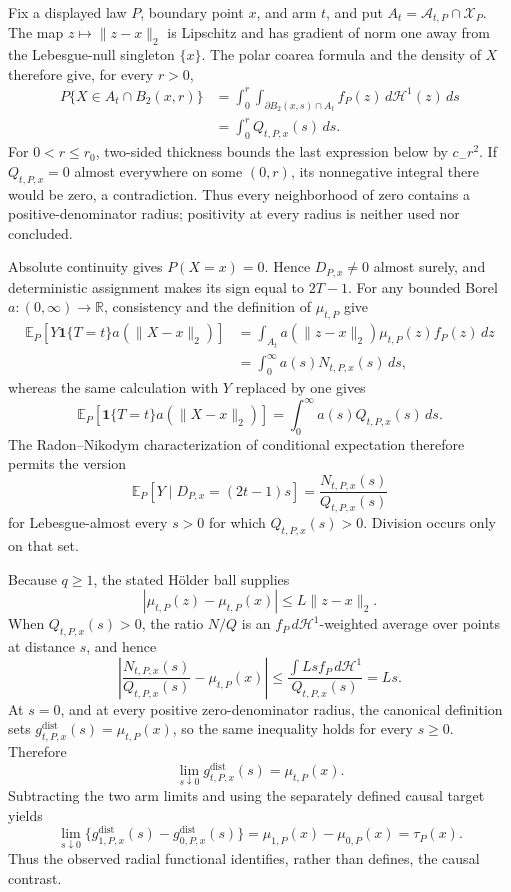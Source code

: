 Fix a displayed law \(P\), boundary point \(x\), and arm \(t\), and put \(A_t=\mathcal A_{t,P}\cap\mathcal X_P\).  The map \(z\mapsto\lVert z-x\rVert_2\) is Lipschitz and has gradient of norm one away from the Lebesgue-null singleton \(\{x\}\).  The polar coarea formula and the density of \(X\) therefore give, for every \(r>0\),
\[
\begin{aligned}
 P\{X\in A_t\cap B_2(x,r)\}
 &=\int_0^r\int_{\partial B_2(x,s)\cap A_t}
 f_P(z)\,d\mathcal H^1(z)\,ds\\
 &=\int_0^rQ_{t,P,x}(s)\,ds.
\end{aligned}
\]
For \(0<r\leq r_0\), two-sided thickness bounds the last expression below by \(c_-r^2\).  If \(Q_{t,P,x}=0\) almost everywhere on some \((0,r)\), its nonnegative integral there would be zero, a contradiction.  Thus every neighborhood of zero contains a positive-denominator radius; positivity at every radius is neither used nor concluded.

Absolute continuity gives \(P(X=x)=0\).  Hence \(D_{P,x}\neq0\) almost surely, and deterministic assignment makes its sign equal to \(2T-1\).  For any bounded Borel \(a:(0,\infty)\to\mathbb R\), consistency and the definition of \(\mu_{t,P}\) give
\[
\begin{aligned}
 \mathbb E_P\!\left[Y\mathbf1\{T=t\}a(\lVert X-x\rVert_2)\right]
 &=\int_{A_t}a(\lVert z-x\rVert_2)\mu_{t,P}(z)f_P(z)\,dz\\
 &=\int_0^\infty a(s)N_{t,P,x}(s)\,ds,
\end{aligned}
\]
whereas the same calculation with \(Y\) replaced by one gives
\[
 \mathbb E_P\!\left[\mathbf1\{T=t\}a(\lVert X-x\rVert_2)\right]
 =\int_0^\infty a(s)Q_{t,P,x}(s)\,ds.
\]
The Radon--Nikodym characterization of conditional expectation therefore permits the version
\[
 \mathbb E_P[Y\mid D_{P,x}=(2t-1)s]
 =\frac{N_{t,P,x}(s)}{Q_{t,P,x}(s)}
\]
for Lebesgue-almost every \(s>0\) for which \(Q_{t,P,x}(s)>0\).  Division occurs only on that set.

Because \(q\geq1\), the stated H\"older ball supplies
\[
 |\mu_{t,P}(z)-\mu_{t,P}(x)|\leq L\lVert z-x\rVert_2.
\]
When \(Q_{t,P,x}(s)>0\), the ratio \(N/Q\) is an \(f_P\,d\mathcal H^1\)-weighted average over points at distance \(s\), and hence
\[
 \left|\frac{N_{t,P,x}(s)}{Q_{t,P,x}(s)}-\mu_{t,P}(x)\right|
 \leq\frac{\int Ls f_P\,d\mathcal H^1}{Q_{t,P,x}(s)}=Ls.
\]
At \(s=0\), and at every positive zero-denominator radius, the canonical definition sets \(g^{\mathrm{dist}}_{t,P,x}(s)=\mu_{t,P}(x)\), so the same inequality holds for every \(s\geq0\).  Therefore
\[
 \lim_{s\downarrow0}g^{\mathrm{dist}}_{t,P,x}(s)=\mu_{t,P}(x).
\]
Subtracting the two arm limits and using the separately defined causal target yields
\[
 \lim_{s\downarrow0}\{g^{\mathrm{dist}}_{1,P,x}(s)-g^{\mathrm{dist}}_{0,P,x}(s)\}
 =\mu_{1,P}(x)-\mu_{0,P}(x)=\tau_P(x).
\]
Thus the observed radial functional identifies, rather than defines, the causal contrast.